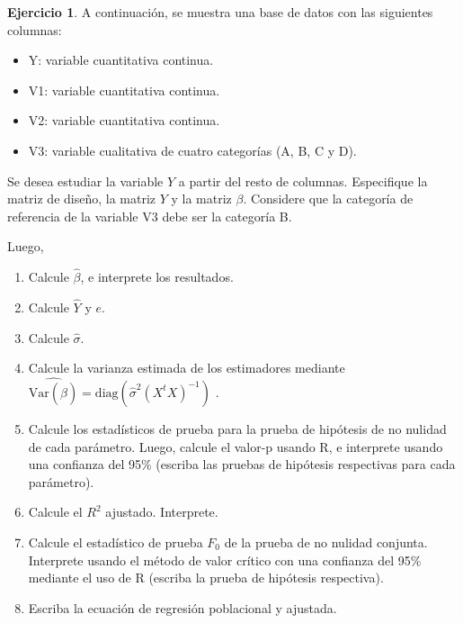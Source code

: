 \documentclass[
  11pt,
]{book}
\providecommand{\tightlist}{%
  \setlength{\itemsep}{0pt}\setlength{\parskip}{0pt}}
\theoremstyle{definition}
\theoremstyle{definition}
\theoremstyle{definition}
\newtheorem{exercise}{Ejercicio}[chapter]
\theoremstyle{definition}
\theoremstyle{remark}
\begin{document}
\begin{exercise}

A continuación, se muestra una base de datos con las siguientes columnas:

\begin{itemize}
\tightlist
\item
  Y: variable cuantitativa continua.
\item
  V1: variable cuantitativa continua.
\item
  V2: variable cuantitativa continua.
\item
  V3: variable cualitativa de cuatro categorías (A, B, C y D).
\end{itemize}

\begin{table}[H]
\centering
{}
\end{table}

Se desea estudiar la variable \(Y\) a partir del resto de columnas. Especifique la matriz de diseño, la matriz \(Y\) y la matriz \(\beta\). Considere que la categoría de referencia de la variable V3 debe ser la categoría B.

Luego,

\begin{enumerate}
\def\labelenumi{\arabic{enumi}.}
\tightlist
\item
  Calcule \(\widehat\beta\), e interprete los resultados.
\item
  Calcule \(\widehat{Y}\) y \(e\).
\item
  Calcule \(\widehat\sigma\).
\item
  Calcule la varianza estimada de los estimadores mediante \(\widehat{\mathrm{Var}(\hat{\beta})} = \text{diag}(\widehat\sigma^2 (X^tX)^{-1})\) .
\item
  Calcule los estadísticos de prueba para la prueba de hipótesis de no nulidad de cada parámetro. Luego, calcule el valor-p usando R, e interprete usando una confianza del 95\% (escriba las pruebas de hipótesis respectivas para cada parámetro).
\item
  Calcule el \(R^2\) ajustado. Interprete.
\item
  Calcule el estadístico de prueba \(F_0\) de la prueba de no nulidad conjunta. Interprete usando el método de valor crítico con una confianza del 95\% mediante el uso de R (escriba la prueba de hipótesis respectiva).
\item
  Escriba la ecuación de regresión poblacional y ajustada.
\end{enumerate}

\end{exercise}
\end{document}
